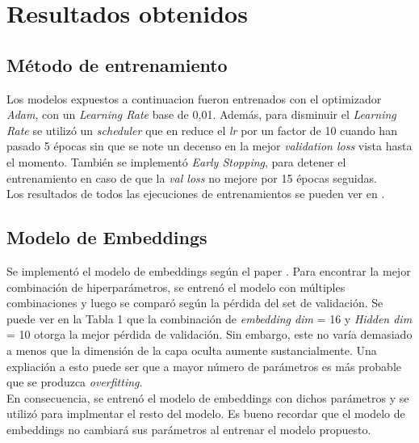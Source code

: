 \documentclass[sigplan,screen]{acmart}
\begin{document}
\section{Resultados obtenidos}

\subsection{Método de entrenamiento}

Los modelos expuestos a continuacion fueron entrenados con el optimizador \textit{Adam}, con un \textit{Learning Rate} base de 0,01. Además, para disminuir el \textit{Learning Rate}
se utilizó un \textit{scheduler} que en reduce el \textit{lr} por un factor de 10 cuando han pasado 5 épocas sin que se note un decenso en la mejor \textit{validation loss} vista hasta el momento. También se implementó \textit{Early Stopping}, para detener el entrenamiento en caso de que la \textit{val loss} no mejore por 15 épocas seguidas. \\

Los resultados de todos las ejecuciones de entrenamientos se pueden ver en \cite{wandb}.

\subsection{Modelo de Embeddings}

Se implementó el modelo de embeddings según el paper \cite{bengio2000neural}. Para encontrar la mejor combinación de hiperparámetros, se entrenó el modelo con múltiples combinaciones y luego se comparó según la pérdida del set de validación. Se puede ver en la Tabla 1 que la combinación de \textit{embedding dim} = 16 y \textit{Hidden dim} = 10 otorga la mejor pérdida de validación.  Sin embargo, este no varía demasiado a menos que la dimensión de la capa oculta aumente sustancialmente.  Una expliación a esto puede ser que a mayor número de parámetros es más probable que se produzca \textit{overfitting}. \\

En consecuencia, se entrenó el modelo de embeddings con dichos parámetros y se utilizó para implmentar el resto del modelo. Es bueno recordar que el modelo de embeddings no cambiará sus parámetros al entrenar el modelo propuesto. 
\end{document}

